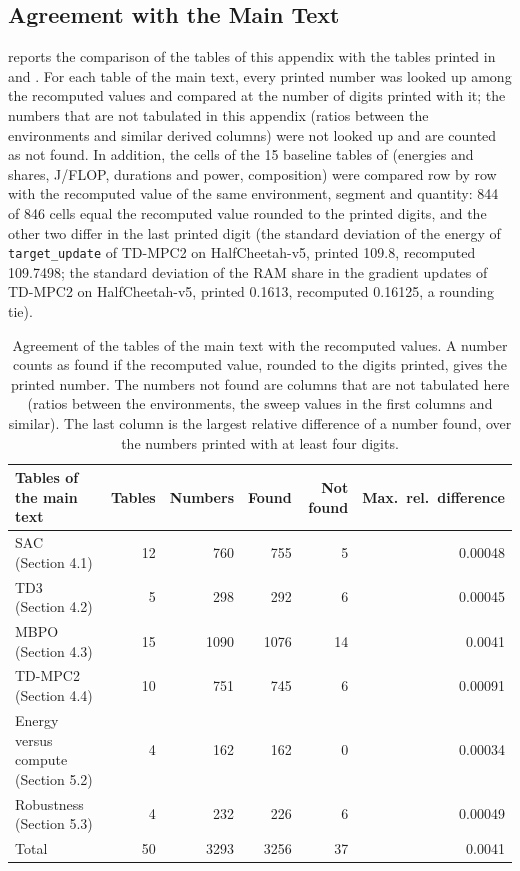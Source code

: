 \subsection{Agreement with the Main Text}\label{sec:app-full-verify}

 reports the comparison of the tables of this appendix with the tables printed in  and .
For each table of the main text, every printed number was looked up among the recomputed values and compared at the number of digits printed with it; the numbers that are not tabulated in this appendix (ratios between the environments and similar derived columns) were not looked up and are counted as not found.
In addition, the cells of the \num{15} baseline tables of  (energies and shares, J/FLOP, durations and power, composition) were compared row by row with the recomputed value of the same environment, segment and quantity: \num{844} of \num{846} cells equal the recomputed value rounded to the printed digits, and the other two differ in the last printed digit (the standard deviation of the energy of \texttt{target\_\allowbreak update} of TD-MPC2 on HalfCheetah-v5, printed \num{109.8}, recomputed \num{109.7498}; the standard deviation of the RAM share in the gradient updates of TD-MPC2 on HalfCheetah-v5, printed \num{0.1613}, recomputed \num{0.16125}, a rounding tie).

\begin{table}[tbp]
  \centering
  \footnotesize
  \caption{Agreement of the tables of the main text with the recomputed values. A number counts as found if the recomputed value, rounded to the digits printed, gives the printed number. The numbers not found are columns that are not tabulated here (ratios between the environments, the sweep values in the first columns and similar). The last column is the largest relative difference of a number found, over the numbers printed with at least four digits.}
  \label{tab:app-verification}
  \begin{tabular}{@{}lrrrrr@{}}
    \toprule
    Tables of the main text & Tables & Numbers & Found & Not found & Max.\ rel.\ difference \\
    \midrule
    SAC (Section 4.1) & \num{12} & \num{760} & \num{755} & \num{5} & \num{0.00048} \\
    TD3 (Section 4.2) & \num{5} & \num{298} & \num{292} & \num{6} & \num{0.00045} \\
    MBPO (Section 4.3) & \num{15} & \num{1090} & \num{1076} & \num{14} & \num{0.0041} \\
    TD-MPC2 (Section 4.4) & \num{10} & \num{751} & \num{745} & \num{6} & \num{0.00091} \\
    Energy versus compute (Section 5.2) & \num{4} & \num{162} & \num{162} & \num{0} & \num{0.00034} \\
    Robustness (Section 5.3) & \num{4} & \num{232} & \num{226} & \num{6} & \num{0.00049} \\
    \midrule
    Total & \num{50} & \num{3293} & \num{3256} & \num{37} & \num{0.0041} \\
    \bottomrule
  \end{tabular}
\end{table}


